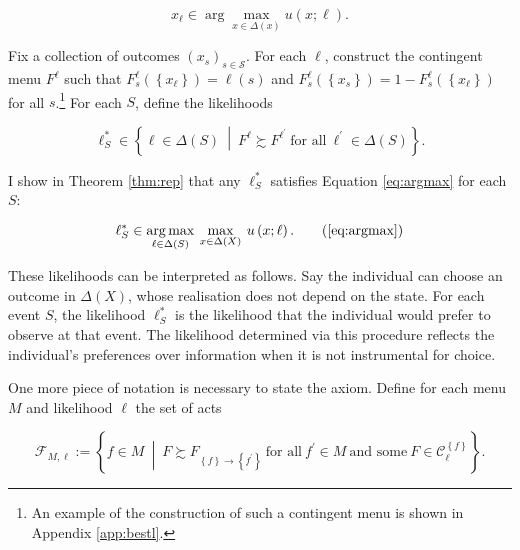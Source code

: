 \[
	x_{\ell} \in \arg \max_{x \in \Delta \left( x \right)} u \left( x ; \ell \right) .
\]

Fix a collection of outcomes \( \left( x_s \right)_{s \in \mathcal{S}} \). For each \( \ell \), construct the contingent menu \( F^{\ell} \) such that \( F_s^{\ell} \left( \left\{ x_{\ell} \right\} \right) = \ell \left( s \right) \) and \( F^{\ell}_s \left( \left\{ x_{s} \right\} \right) = 1 - F^{\ell}_s \left( \left\{ x_{\ell} \right\} \right) \) for all \( s \).\footnote{An example of the construction of such a contingent menu is shown in Appendix \ref{app:bestl}.} For each \( S \), define the likelihoods

\begin{equation}\label{eq:bestlset}
	\ell^{*}_S \in \left\{ \ell \in \Delta \left( S \right) \: \middle\vert \: F^{\ell} \succsim F^{\ell^{\prime}} \: \text{for all} \: \ell^{\prime} \in \Delta \left( S \right) \right\} .
\end{equation}

I show in Theorem \ref{thm:rep} that any \( \ell^{*}_S \) satisfies Equation \eqref{eq:argmax} for each \( S \):

\begin{equation}
	\ell^{*}_S \in \underset{\ell \in \Delta \left( S \right)}{\arg \max} \: \max_{x \in \Delta \left( X \right)} \: u \left( x ; \ell \right) . \tag{\ref{eq:argmax}}
\end{equation}

These likelihoods can be interpreted as follows. Say the individual can choose an outcome in \( \Delta \left( X \right) \), whose realisation does not depend on the state. For each event \( S \), the likelihood \( \ell^{*}_{S} \) is the likelihood that the individual would prefer to observe at that event. The likelihood determined via this procedure reflects the individual's preferences over information when it is not instrumental for choice.

One more piece of notation is necessary to state the axiom. Define for each menu \( M \) and likelihood \( \ell \) the set of acts

\[
	\mathcal{F}_{M, \ell} := \left\{ f \in M \: \middle\vert \: F \succsim F_{\left\{ f \right\} \rightarrow \left\{ f^{\prime} \right\}} \: \text{for all} \: f^{\prime} \in M \: \text{and some} \: F \in \mathcal{C}^{\left\{ f \right\} }_{\ell} \right\} .
\]

